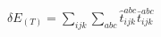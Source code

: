 \documentclass{standalone}
\begin{document}
$\displaystyle \delta E_{(T)} = \sum_{ijk} \sum_{abc}  \hat{t}_{ijk}^{abc} \bar{t}_{ijk}^{abc}$
\end{document}
